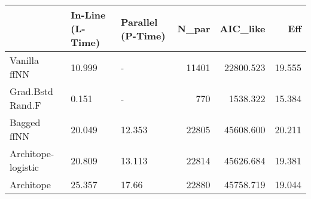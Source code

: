 \begin{tabular}{lllrrr}
\toprule
{} & In-Line (L-Time) & Parallel (P-Time) &  N\_par &   AIC\_like &     Eff \\
\midrule
Vanilla ffNN       &           10.999 &                 - &  11401 &  22800.523 &  19.555 \\
Grad.Bstd Rand.F   &            0.151 &                 - &    770 &   1538.322 &  15.384 \\
Bagged ffNN        &           20.049 &            12.353 &  22805 &  45608.600 &  20.211 \\
Architope-logistic &           20.809 &            13.113 &  22814 &  45626.684 &  19.381 \\
Architope          &           25.357 &             17.66 &  22880 &  45758.719 &  19.044 \\
\bottomrule
\end{tabular}
